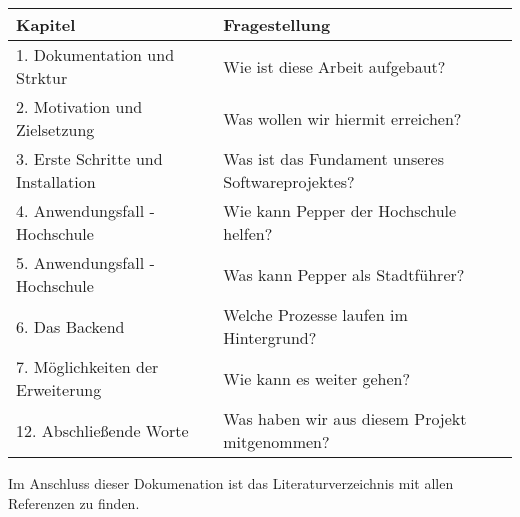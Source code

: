 \begin{table}[H]
	\centering
	\begin{tabular}{l|l}
		\hline
		\hline
		Kapitel                            & Fragestellung                                    \\
		\hline
		1. Dokumentation und Strktur       & Wie ist diese Arbeit aufgebaut?                  \\
		2. Motivation und Zielsetzung      & Was wollen wir hiermit erreichen?                \\
		3. Erste Schritte und Installation & Was ist das Fundament unseres Softwareprojektes? \\
		4. Anwendungsfall - Hochschule     & Wie kann Pepper der Hochschule helfen?           \\
		5. Anwendungsfall - Hochschule     & Was kann Pepper als Stadtführer?                 \\
		6. Das Backend                     & Welche Prozesse laufen im Hintergrund?           \\
		7. Möglichkeiten der Erweiterung   & Wie kann es weiter gehen?                        \\
		12. Abschließende Worte            & Was haben wir aus diesem Projekt mitgenommen?    \\
		\hline
	\end{tabular}
	\label{tab:logic_flow}
\end{table}

Im Anschluss dieser Dokumenation ist das Literaturverzeichnis mit allen Referenzen zu finden.

